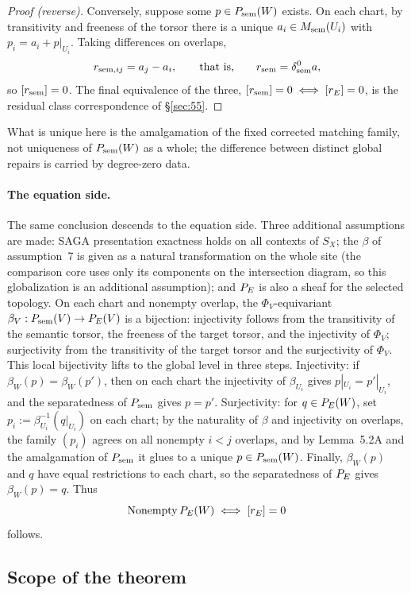 \begin{proof}[Proof (reverse)]
Conversely, suppose some $p\in P_{\mathrm{sem}}(W)$ exists. On each chart, by
transitivity and freeness of the torsor there is a unique
$a_i\in M_{\mathrm{sem}}(U_i)$ with $p_i=a_i+p|_{U_i}$. Taking differences on
overlaps,
\[
r_{\mathrm{sem},ij}=a_j-a_i,
\qquad\text{that is,}\qquad
r_{\mathrm{sem}}=\delta^0_{\mathrm{sem}}a,
\]
so $[r_{\mathrm{sem}}]=0$. The final equivalence of the three,
$[r_{\mathrm{sem}}]=0\iff[r_{E}]=0$, is the residual class correspondence of
\S\ref{sec:55}.
\end{proof}

What is unique here is the amalgamation of the fixed corrected
matching family, not uniqueness of $P_{\mathrm{sem}}(W)$ as a whole; the
difference between distinct global repairs is carried by degree-zero
data.

\paragraph{The equation side.}
The same conclusion descends to the equation side. Three additional
assumptions are made: SAGA presentation exactness holds on all
contexts of $S_X$; the $\beta$ of assumption~7 is given as a natural
transformation on the whole site (the comparison core uses only its
components on the intersection diagram, so this globalization is an
additional assumption); and $P_{E}$ is also a sheaf for the selected
topology. On each chart and nonempty overlap, the
$\Phi_V$-equivariant $\beta_V:P_{\mathrm{sem}}(V)\to P_{E}(V)$ is a bijection:
injectivity follows from the transitivity of the semantic torsor, the
freeness of the target torsor, and the injectivity of $\Phi_V$;
surjectivity from the transitivity of the target torsor and the
surjectivity of $\Phi_V$. This local bijectivity lifts to the global
level in three steps. Injectivity: if $\beta_W(p)=\beta_W(p')$, then
on each chart the injectivity of $\beta_{U_i}$ gives
$p|_{U_i}=p'|_{U_i}$, and the separatedness of $P_{\mathrm{sem}}$ gives $p=p'$.
Surjectivity: for $q\in P_{E}(W)$, set
$p_i:=\beta_{U_i}^{-1}(q|_{U_i})$ on each chart; by the naturality of
$\beta$ and injectivity on overlaps, the family $(p_i)$ agrees on all
nonempty $i<j$ overlaps, and by Lemma~5.2A and the amalgamation of
$P_{\mathrm{sem}}$ it glues to a unique $p\in P_{\mathrm{sem}}(W)$. Finally, $\beta_W(p)$
and $q$ have equal restrictions to each chart, so the separatedness
of $P_{E}$ gives $\beta_W(p)=q$. Thus
\[
\mathrm{Nonempty}\,P_{E}(W)\iff[r_{E}]=0
\]
follows.

\subsection{Scope of the theorem}\label{sec:57}

